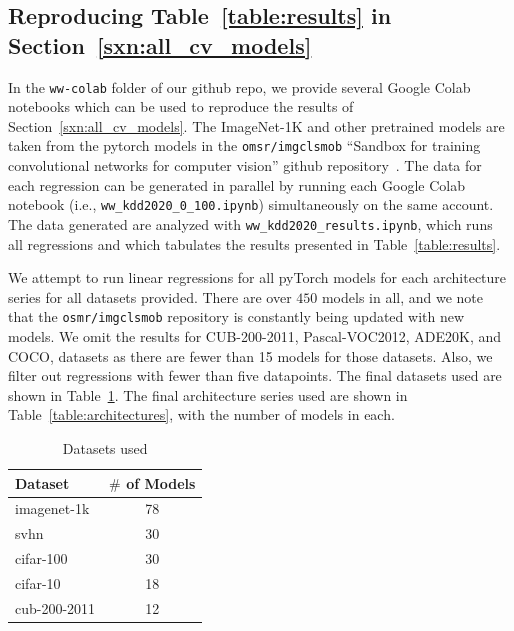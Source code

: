 \subsection{Reproducing Table~\ref{table:results} in Section~\ref{sxn:all_cv_models} }

In the \texttt{ww-colab} folder of our github repo, we provide several Google Colab notebooks which can be used to reproduce the results of Section~\ref{sxn:all_cv_models}.
The ImageNet-1K and other pretrained models are taken from the pytorch models in the \texttt{omsr/imgclsmob} 
``Sandbox for training convolutional networks for computer vision'' github repository~\cite{osmr}.
The data for each regression can be generated in parallel by running each Google Colab notebook (i.e., \texttt{ww\_kdd2020\_0\_100.ipynb}) simultaneously on the same account.
The data generated are analyzed with \texttt{ww\_kdd2020\_results.ipynb}, which runs all regressions and which tabulates the results presented in Table~\ref{table:results}.

We attempt to run linear regressions for all pyTorch models for each architecture series for all datasets provided.  
There are over $450$ models in all, and we note that the \texttt{osmr/imgclsmob} repository is constantly being updated with new models.
We omit the results for CUB-200-2011, Pascal-VOC2012, ADE20K, and COCO, datasets as there are fewer than 15 models for those datasets.  
Also, we filter out regressions with fewer than five datapoints.
The final datasets used are shown in Table~\ref{table:datasets}.
The final architecture series used are shown in  Table~\ref{table:architectures}, with the number of models in each.

\begin{table}[t]
\small
\begin{center}
\begin{tabular}{|p{1in}|c|}
\hline
Dataset & $\#$ of Models \\
\hline
imagenet-1k   &  78 \\
svhn          &  30 \\
cifar-100     &  30 \\
cifar-10      &  18 \\
cub-200-2011  &  12 \\
\hline
\end{tabular}
\end{center}
\caption{Datasets used}
\label{table:datasets}
\end{table}

